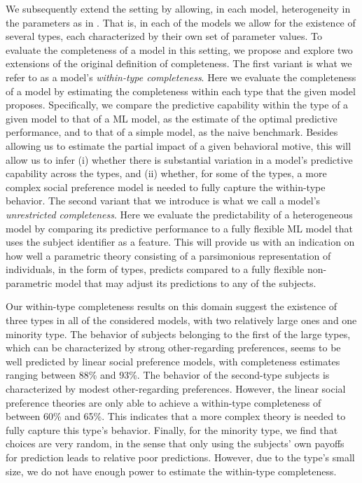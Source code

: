 \documentclass[11pt,a4paper]{article}
\theoremstyle{definition}
\begin{document}
We subsequently extend the setting by allowing, in each model, heterogeneity in the parameters as in \cite{Bruhin2019}. That is, in each of the models we allow for the existence of several types, each characterized by their own set of parameter values. To evaluate the completeness of a model in this setting, we propose and explore two extensions of the original definition of completeness. The first variant is what we refer to as a model's \emph{within-type completeness}. Here we evaluate the completeness of a model by estimating the completeness within each type that the given model proposes. Specifically, we compare the predictive capability within the type of a given model to that of a ML model, as the estimate of the optimal predictive performance, and to that of a simple model, as the naive benchmark. Besides allowing us to estimate the partial impact of a given behavioral motive, this will allow us to infer (i) whether there is substantial variation in a model's predictive capability across the types, and (ii) whether, for some of the types, a more complex social preference model is needed to fully capture the within-type behavior.
The second variant that we introduce is what we call a model's \emph{unrestricted completeness}. Here we evaluate the predictability of a heterogeneous model by comparing its predictive performance to a fully flexible ML model that uses the subject identifier as a feature. This will provide us with an indication on how well a parametric theory consisting of a parsimonious representation of individuals, in the form of types, predicts compared to a fully flexible non-parametric model that may adjust its predictions to any of the subjects.

Our within-type completeness results on this domain suggest the existence of three types in all of the considered models, with two relatively large ones and one minority type. The behavior of subjects belonging to the first of the large types, which can be characterized by strong other-regarding preferences, seems to be well predicted by linear social preference models, with completeness estimates ranging between 88\% and 93\%. The behavior of the second-type subjects is characterized by modest other-regarding preferences. However, the linear social preference theories are only able to achieve a within-type completeness of between 60\% and 65\%. This indicates that a more complex theory is needed to fully capture this type's behavior. Finally, for the minority type, we find that choices are very random, in the sense that only using the subjects' own payoffs for prediction leads to relative poor predictions. However,  due to the type's small size, we do not have enough power to estimate the within-type completeness.
\end{document}

